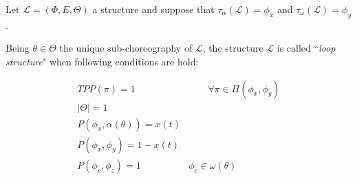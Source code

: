 \documentclass[12pt,a4paper]{report}
\theoremstyle{definition}
\begin{document}
Let $\mathcal{L} = (\Phi,E,\Theta)$ a structure and suppose that $\tau_{\alpha}(\mathcal{L}) = \phi_{x}$ and $\tau_{\omega} (\mathcal{L}) = \phi_{y}$. 

Being $\theta \in \Theta$ the unique sub-choreography of $\mathcal{L}$, the structure $\mathcal{L}$ is called ``\textit{loop structure}" when following conditions are hold:

\begin{eqnarray}
	TPP(\pi) = 1 & \qquad \forall \pi \in \Pi(\phi_{x}, \phi_{y}) \\
	|\Theta| = 1  &  \\
	P(\phi_{x}, \alpha(\theta)) = x(t) & \\
	P(\phi_{x}, \phi_{y}) = 1 - x(t) & \\
	P(\phi_{c}, \phi_{z}) = 1 & \phi_{c} \in \omega(\theta)\\
\end{eqnarray}
\end{document}
